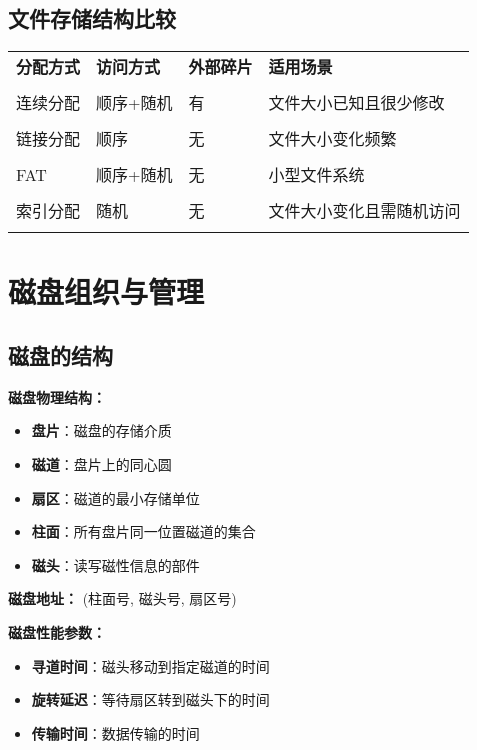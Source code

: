 \documentclass[lang=cn,newtx,10pt,scheme=chinese]{../../elegantbook}
\begin{document}
\subsection{文件存储结构比较}

\begin{longtable}{@{}p{3cm}p{3cm}p{3cm}p{4cm}@{}}
\toprule
\textbf{分配方式} & \textbf{访问方式} & \textbf{外部碎片} & \textbf{适用场景} \\\\ \midrule
\endhead

连续分配 & 顺序+随机 & 有 & 文件大小已知且很少修改 \\\\
链接分配 & 顺序 & 无 & 文件大小变化频繁 \\\\
FAT & 顺序+随机 & 无 & 小型文件系统 \\\\
索引分配 & 随机 & 无 & 文件大小变化且需随机访问 \\\\

\bottomrule
\end{longtable}

\section{磁盘组织与管理}

\subsection{磁盘的结构}

\textbf{磁盘物理结构：}
\begin{itemize}
  \item \textbf{盘片}：磁盘的存储介质
  \item \textbf{磁道}：盘片上的同心圆
  \item \textbf{扇区}：磁道的最小存储单位
  \item \textbf{柱面}：所有盘片同一位置磁道的集合
  \item \textbf{磁头}：读写磁性信息的部件
\end{itemize}

\textbf{磁盘地址：}
(柱面号, 磁头号, 扇区号)

\textbf{磁盘性能参数：}
\begin{itemize}
  \item \textbf{寻道时间}：磁头移动到指定磁道的时间
  \item \textbf{旋转延迟}：等待扇区转到磁头下的时间
  \item \textbf{传输时间}：数据传输的时间
\end{itemize}
\end{document}
